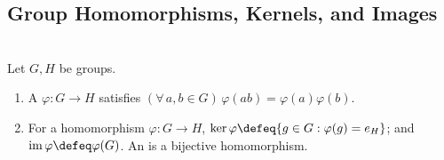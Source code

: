 \subsection{Group Homomorphisms, Kernels, and Images}

\begin{definition} \label{def:group-homomorphism-kernel-image} \\
Let $G,H$ be groups.
\begin{enumerate}[label=(\roman*)]
\setlength{\itemsep}{0pt}
\item A  $\varphi:G\to H$ satisfies $(\forall\,a,b\in G)\,\varphi(ab)=\varphi(a)\varphi(b)$.
\item For a homomorphism $\varphi:G\to H$, $\ker\varphi\defeq\{g\in G:\varphi(g)=e_H\}$; and $\operatorname{im}\varphi\defeq\varphi(G)$. An  is a bijective homomorphism.
\end{enumerate}
\end{definition}

